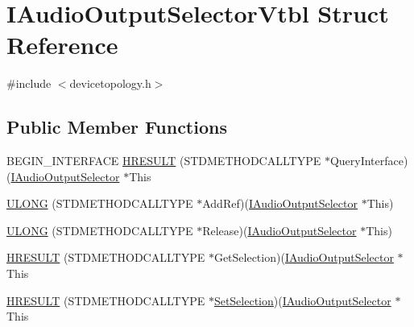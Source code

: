 \hypertarget{struct_i_audio_output_selector_vtbl}{}\section{I\+Audio\+Output\+Selector\+Vtbl Struct Reference}
\label{struct_i_audio_output_selector_vtbl}


{\ttfamily \#include $<$devicetopology.\+h$>$}

\subsection*{Public Member Functions}
\begin{DoxyCompactItemize}
\item 
B\+E\+G\+I\+N\+\_\+\+I\+N\+T\+E\+R\+F\+A\+CE \hyperlink{struct_i_audio_output_selector_vtbl_ae27380c28e08f9b38ee359d577d1a4c0}{H\+R\+E\+S\+U\+LT} (S\+T\+D\+M\+E\+T\+H\+O\+D\+C\+A\+L\+L\+T\+Y\+PE $\ast$Query\+Interface)(\hyperlink{devicetopology_8h_a68641fd18c565860af1edfe4937f20f1}{I\+Audio\+Output\+Selector} $\ast$This
\item 
\hyperlink{struct_i_audio_output_selector_vtbl_a392fd7896f199ac80ab4f3bf12390a14}{U\+L\+O\+NG} (S\+T\+D\+M\+E\+T\+H\+O\+D\+C\+A\+L\+L\+T\+Y\+PE $\ast$Add\+Ref)(\hyperlink{devicetopology_8h_a68641fd18c565860af1edfe4937f20f1}{I\+Audio\+Output\+Selector} $\ast$This)
\item 
\hyperlink{struct_i_audio_output_selector_vtbl_a8b0d62453fb0ecc4353d21d2703f1899}{U\+L\+O\+NG} (S\+T\+D\+M\+E\+T\+H\+O\+D\+C\+A\+L\+L\+T\+Y\+PE $\ast$Release)(\hyperlink{devicetopology_8h_a68641fd18c565860af1edfe4937f20f1}{I\+Audio\+Output\+Selector} $\ast$This)
\item 
\hyperlink{struct_i_audio_output_selector_vtbl_a8561a8c53195f23fab0c4c8c7b3531f2}{H\+R\+E\+S\+U\+LT} (S\+T\+D\+M\+E\+T\+H\+O\+D\+C\+A\+L\+L\+T\+Y\+PE $\ast$Get\+Selection)(\hyperlink{devicetopology_8h_a68641fd18c565860af1edfe4937f20f1}{I\+Audio\+Output\+Selector} $\ast$This
\item 
\hyperlink{struct_i_audio_output_selector_vtbl_a8cff497e6abe345e7271ffd52a5c5d31}{H\+R\+E\+S\+U\+LT} (S\+T\+D\+M\+E\+T\+H\+O\+D\+C\+A\+L\+L\+T\+Y\+PE $\ast$\hyperlink{_mac_command_win_8h_aae86b47ff210244d75f17a6e58233a31}{Set\+Selection})(\hyperlink{devicetopology_8h_a68641fd18c565860af1edfe4937f20f1}{I\+Audio\+Output\+Selector} $\ast$This
\end{DoxyCompactItemize}
